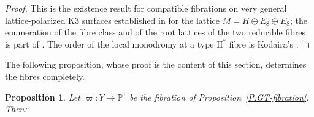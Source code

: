\documentclass[11pt]{amsart}
\theoremstyle{plain}
\newtheorem{proposition}[theorem]{Proposition}
\theoremstyle{definition}
\theoremstyle{remark}
\numberwithin{equation}{section}
\begin{document}
\begin{proof}
This is the existence result for compatible fibrations on very general
lattice-polarized K3 surfaces established in \cite[\S 4]{dfk3slpms} for the
lattice \(M=H\oplus E_{8}\oplus E_{8}\); the enumeration of the fibre class
and of the root lattices of the two reducible fibres is part of
\cite[Definition 4.21]{dfk3slpms}. The order of the local monodromy at a
type \(\mathrm{II}^{*}\) fibre is Kodaira's \cite{kodaira}.
\end{proof}

The following proposition, whose proof is the content of this section,
determines the fibres completely.

\begin{proposition}\label{P:fibration-structure}
Let \(\varpi\colon Y\to\mathbb P^{1}\) be the fibration of
Proposition~\ref{P:GT-fibration}. Then:
\end{proposition}
\end{document}
